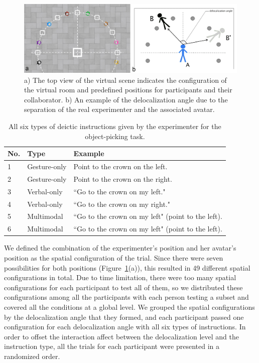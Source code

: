 \begin{figure}[htb]
  \centering
  \includegraphics[width=\textwidth]{figures/ch3/floor}
  \caption{\label{fig:3_floor}a) The top view of the virtual scene indicates the configuration of the virtual room and predefined positions for participants and their collaborator. b) An example of the delocalization angle due to the separation of the real experimenter and the associated avatar.}
\end{figure}

\begin{table}[!t]
\renewcommand{\arraystretch}{1.3}
\caption{All six types of deictic instructions given by the experimenter for the object-picking task.}
\label{tab:3_instruction_type}
\centering
\begin{tabular}{l l l}
  \hline
  No. & Type & Example \\
  \hline
    1 & Gesture-only & Point to the crown on the left. \\
    2 & Gesture-only & Point to the crown on the right. \\
    3 & Verbal-only & ``Go to the crown on my left." \\
    4 & Verbal-only & ``Go to the crown on my right." \\
    5 & Multimodal & ``Go to the crown on my left" (point to the left). \\
    6 & Multimodal & ``Go to the crown on my left" (point to the left). \\ \hline
\end{tabular}
\end{table}

We defined the combination of the experimenter's position and her avatar's position as the spatial configuration of the trial. Since there were seven possibilities for both positions (Figure~\ref{fig:3_floor}(a)), this resulted in 49 different spatial configurations in total. Due to time limitation, there were too many spatial configurations for each participant to test all of them, so we distributed these configurations among all the participants with each person testing a subset and covered all the conditions at a global level. We grouped the spatial configurations by the delocalization angle that they formed, and each participant passed one configuration for each delocalization angle with all six types of instructions. In order to offset the interaction affect between the delocalization level and the instruction type, all the trials for each participant were presented in a randomized order.

